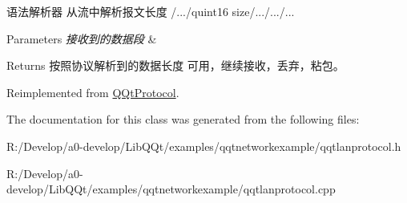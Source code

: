语法解析器 从流中解析报文长度 /.../quint16 size/.../.../... 


\begin{DoxyParams}{Parameters}
{\em 接收到的数据段} & \\
\hline
\end{DoxyParams}
\begin{DoxyReturn}{Returns}
按照协议解析到的数据长度 可用，继续接收，丢弃，粘包。 
\end{DoxyReturn}


Reimplemented from \mbox{\hyperlink{class_q_qt_protocol_a00fd0c1ac23379ed3b9b25da9a34f39b}{Q\+Qt\+Protocol}}.



The documentation for this class was generated from the following files\+:\begin{DoxyCompactItemize}
\item 
R\+:/\+Develop/a0-\/develop/\+Lib\+Q\+Qt/examples/qqtnetworkexample/qqtlanprotocol.\+h\item 
R\+:/\+Develop/a0-\/develop/\+Lib\+Q\+Qt/examples/qqtnetworkexample/qqtlanprotocol.\+cpp\end{DoxyCompactItemize}

